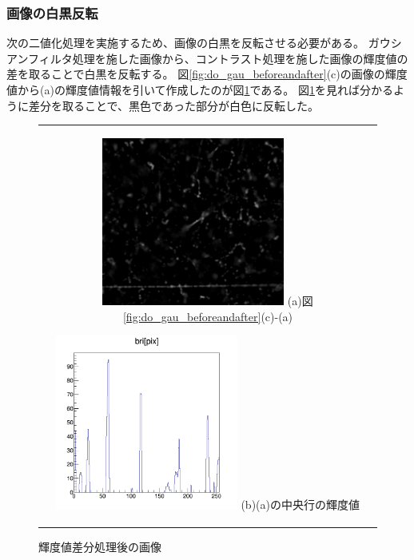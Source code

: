 \documentclass[12pt,a4paper]{jarticle}
\begin{document}
\subsubsection{画像の白黒反転}
次の二値化処理を実施するため、画像の白黒を反転させる必要がある。
ガウシアンフィルタ処理を施した画像から、コントラスト処理を施した画像の輝度値の差を取ることで白黒を反転する。
図\ref{fig:do_gau_beforeandafter}(c)の画像の輝度値から(a)の輝度値情報を引いて作成したのが図\ref{fig:do_sub}である。
図\ref{fig:do_sub}を見れば分かるように差分を取ることで、黒色であった部分が白色に反転した。
\begin{figure}[htbp]
  \centering
      \begin{tabular}{c}
        \begin{minipage}{0.5\hsize}
          \centering
            \includegraphics[clip, width=60mm]{sub.png}
            \hspace{1.6cm} (a)図\ref{fig:do_gau_beforeandafter}(c)-(a)
        \end{minipage}

        \begin{minipage}{0.5\hsize}
          \centering
            \includegraphics[clip, width=60mm]{sub_hist.png}
            \hspace{1.6cm} (b)(a)の中央行の輝度値
        \end{minipage}
    
      \end{tabular}
      \caption{輝度値差分処理後の画像\label{fig:do_sub}}
\end{figure}
\end{document}

